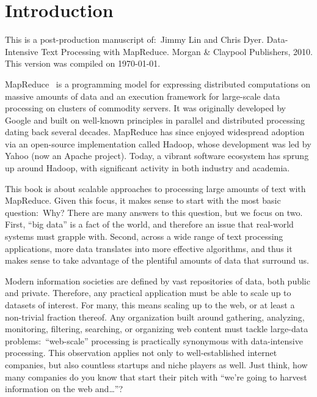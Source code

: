 \chapter{Introduction}
\label{chapter1}

\thispagestyle{empty}

\begin{small}
\noindent This is a post-production manuscript of:\ Jimmy Lin and
Chris Dyer. Data-Intensive Text Processing with MapReduce. Morgan \&
Claypool Publishers, 2010. This version was compiled on \today.\\
\end{small}

\noindent MapReduce~\cite{Dean_Ghemawat_OSDI2004} is a programming model for
expressing distributed computations on massive amounts of data and an
execution framework for large-scale data processing on clusters of
commodity servers.  It was originally developed by Google and built on
well-known principles in parallel and distributed processing dating
back several decades.  MapReduce has since enjoyed widespread adoption
via an open-source implementation called Hadoop, whose development was
led by Yahoo (now an Apache project).  Today, a vibrant software
ecosystem has sprung up around Hadoop, with significant activity in
both industry and academia.

This book is about scalable approaches to processing large amounts of
text with MapReduce.  Given this focus, it makes sense to start with
the most basic question:\ Why?  There are many answers to this
question, but we focus on two.  First, ``big data'' is a fact of the
world, and therefore an issue that real-world systems must grapple
with.  Second, across a wide range of text processing applications,
more data translates into more effective algorithms, and thus it makes
sense to take advantage of the plentiful amounts of data that surround
us.

Modern information societies are defined by vast repositories of data,
both public and private.  Therefore, any practical application must be
able to scale up to datasets of interest.  For many, this means
scaling up to the web, or at least a non-trivial fraction thereof.
Any organization built around gathering, analyzing, monitoring,
filtering, searching, or organizing web content must tackle large-data
problems:\ ``web-scale'' processing is practically synonymous with
data-intensive processing.  This observation applies not only to
well-established internet companies, but also countless startups and
niche players as well.  Just think, how many companies do you know
that start their pitch with ``we're going to harvest information on
the web and\ldots''?

